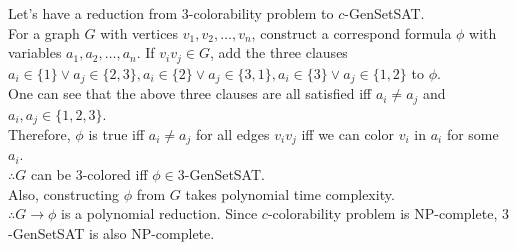 Let's have a reduction from $3$-colorability problem to $c$-GenSetSAT.\\
For a graph $G$ with vertices $v_1, v_2, \dots, v_n$, construct a correspond formula $\phi$ with variables $a_1, a_2, \dots, a_n$. If $v_iv_j\in G$, add the three clauses $a_i\in\{1\}\lor a_j\in\{2, 3\}, a_i\in\{2\}\lor a_j\in\{3, 1\}, a_i\in\{3\}\lor a_j\in\{1, 2\}$ to $\phi$.\\
One can see that the above three clauses are all satisfied iff $a_i\neq a_j$ and $a_i, a_j\in\{1, 2, 3\}$.\\
Therefore, $\phi$ is true iff $a_i\neq a_j$ for all edges $v_iv_j$ iff we can color $v_i$ in $a_i$ for some $a_i$.\\
$\therefore G$ can be $3$-colored iff $\phi\in3$-GenSetSAT.\\
Also, constructing $\phi$ from $G$ takes polynomial time complexity.\\
$\therefore G\to\phi$ is a polynomial reduction. Since $c$-colorability problem is NP-complete, $3$-GenSetSAT is also NP-complete.
